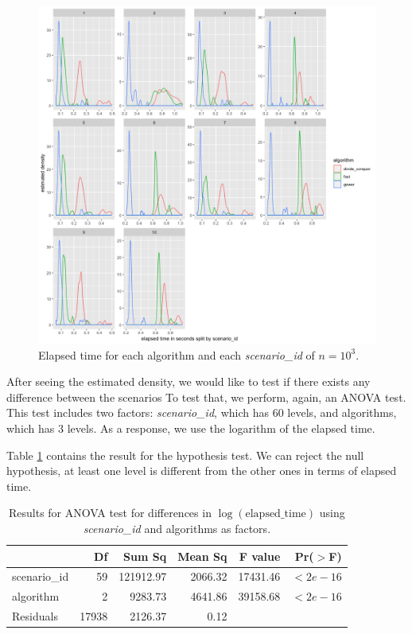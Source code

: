 \documentclass[11pt]{report}
\begin{document}
\begin{figure}[!ht]
\centering
    \includegraphics{./images/elapsed_time_1000.png}
    \caption{Elapsed time for each algorithm and each \textit{scenario\_id} of $n=10^3$.}
    \label{elapsed_time_1000}
\end{figure}


\indent After seeing the estimated density, we would like to test if there 
exists any difference between the scenarios To test that, we perform, again, an 
\textsf{ANOVA} test. This test includes two factors: \textit{scenario\_id},
which has 60 levels, and algorithms, which has 3 levels. As a response, we use
the logarithm of the elapsed time.

\indent Table \ref{anova_elapsed_all_scenarios} contains the result for the 
hypothesis test. We can reject the null hypothesis, at least one level is 
different from the other ones in terms of elapsed time.

\begin{table}[ht]
\centering
\begin{tabular}{lrrrrr}
 & Df & Sum Sq & Mean Sq & F value & Pr($>$F) \\ 
  \hline
scenario\_id & 59 & 121912.97 & 2066.32 & 17431.46 & $<2e-16$ \\ 
  algorithm   & 2 & 9283.73 & 4641.86 & 39158.68 & $<2e-16$ \\ 
  Residuals   & 17938 & 2126.37 & 0.12 &  &  \\ 
   \hline
\end{tabular}
\caption{Results for \textsf{ANOVA} test  for differences in $\log(\mbox{elapsed\_time})$ using \textit{scenario\_id} and algorithms as factors.} 
\label{anova_elapsed_all_scenarios}
\end{table}
\end{document}
